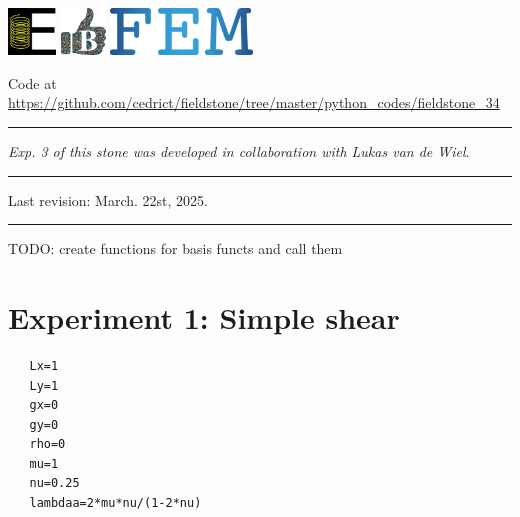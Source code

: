 \includegraphics[height=1.25cm]{images/pictograms/elasticity}
\includegraphics[height=1.25cm]{images/pictograms/benchmark}
\includegraphics[height=1.25cm]{images/pictograms/FEM}


%

\begin{center}
Code at \url{https://github.com/cedrict/fieldstone/tree/master/python_codes/fieldstone_34}
\end{center}

\par\noindent\rule{\textwidth}{0.4pt}

{\sl Exp. 3 of this stone was developed in collaboration with Lukas van de Wiel}.

\par\noindent\rule{\textwidth}{0.4pt}

Last revision: March. 22st, 2025.

\par\noindent\rule{\textwidth}{0.4pt}


TODO: create functions for basis functs and call them


\section*{Experiment 1: Simple shear}

\begin{lstlisting}
   Lx=1
   Ly=1
   gx=0
   gy=0
   rho=0
   mu=1
   nu=0.25   
   lambdaa=2*mu*nu/(1-2*nu)
\end{lstlisting}

